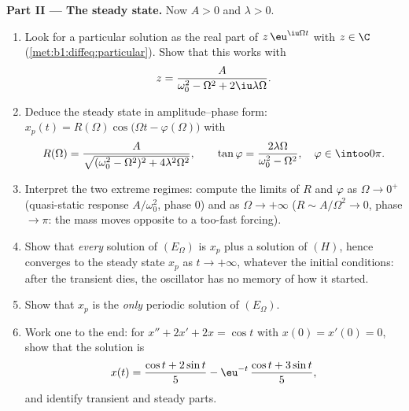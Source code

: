 \begin{problem}
\medskip
\noindent\textbf{Part II --- The steady state.} Now $A > 0$ and
$\lambda > 0$.
\begin{enumerate}[resume]
  \item Look for a particular solution as the real part of
        $z\,\eu^{\iu\Omega t}$ with $z \in \C$
        (\cref{met:b1:diffeq:particular}). Show that this works
        with
        \[
        z = \frac{A}{\omega_0^2 - \Omega^2 + 2\iu\lambda\Omega} .
        \]
  \item Deduce the steady state in amplitude--phase form:
        $x_p(t) = R(\Omega)\cos\bigl(\Omega t -
        \varphi(\Omega)\bigr)$ with
        \[
        R(\Omega) = \frac{A}{\sqrt{(\omega_0^2 - \Omega^2)^2 +
        4\lambda^2\Omega^2}},
        \qquad
        \tan\varphi = \frac{2\lambda\Omega}{\omega_0^2 -
        \Omega^2},
        \quad \varphi \in \intoo0\pi .
        \]
  \item Interpret the two extreme regimes: compute the limits of
        $R$ and $\varphi$ as $\Omega \to 0^+$ (quasi-static
        response $A/\omega_0^2$, phase $0$) and as $\Omega \to
        +\infty$ ($R \sim A/\Omega^2 \to 0$, phase $\to \pi$: the
        mass moves opposite to a too-fast forcing).
  \item Show that \emph{every} solution of $(E_\Omega)$ is $x_p$
        plus a solution of $(H)$, hence converges to the steady
        state $x_p$ as $t \to +\infty$, whatever the initial
        conditions: after the transient dies, the oscillator has
        no memory of how it started.
  \item Show that $x_p$ is the \emph{only} periodic solution of
        $(E_\Omega)$.
  \item Work one  to the end: for $x'' + 2x' + 2x =
        \cos t$ with $x(0) = x'(0) = 0$, show that the solution is
        \[
        x(t) = \frac{\cos t + 2\sin t}5
        - \eu^{-t}\,\frac{\cos t + 3\sin t}5 ,
        \]
        and identify transient and steady parts.
\end{enumerate}


\end{problem}

